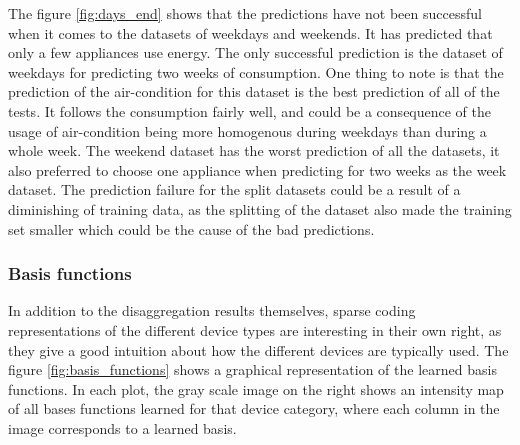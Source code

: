 The figure \ref{fig:days_end} shows that the predictions have not been successful when it comes to the datasets of weekdays and weekends. It has predicted that only a few appliances use energy. The only successful prediction is the dataset of weekdays for predicting two weeks of consumption. One thing to note is that the prediction of the air-condition for this dataset is the best prediction of all of the tests. It follows the consumption fairly well, and could be a consequence of the usage of air-condition being more homogenous during weekdays than during a whole week. The weekend dataset has the worst prediction of all the datasets, it also preferred to choose one appliance when predicting for two weeks as the week dataset. The prediction failure for the split datasets could be a result of a diminishing of training data, as the splitting of the dataset also made the training set smaller which could be the cause of the bad predictions.

\subsubsection{Basis functions}
\label{sec:a_b}
In addition to the disaggregation results themselves, sparse coding representations of the different device types are interesting in their own right, as they give a good intuition about how the different devices are typically used. The figure \ref{fig:basis_functions} shows a graphical representation of the learned basis functions. In each plot, the gray scale image on the right shows an intensity map of all bases functions learned for that device category, where each column in the image corresponds to a learned basis. 

